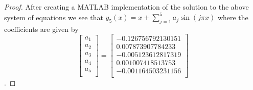 \documentclass[12pt]{article}
\theoremstyle{definition}
\begin{document}
\begin{proof}
  After creating a MATLAB implementation of the solution to the above system of
  equations we see that $y_5(x) = x + \sum_{j=1}^5a_j\sin(j\pi x)$ where the coefficients are given by
  \[
    \begin{bmatrix}
      a_1 \\
      a_2 \\
      a_3 \\
      a_4 \\
      a_5 \\
    \end{bmatrix}
      =
    \begin{bmatrix}
      -0.126756792130151\\
      0.007873907784233\\
      -0.005123612817319\\
      0.001007418513753\\
      -0.001164503231156\\
    \end{bmatrix}
  \].


\end{proof}
\end{document}
